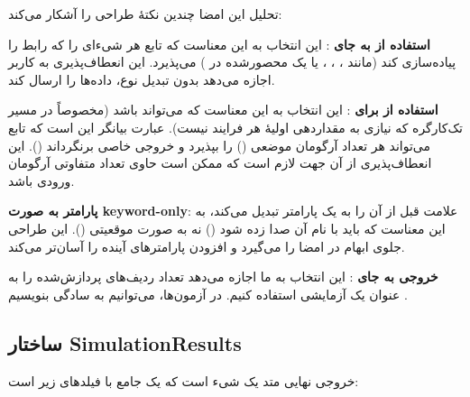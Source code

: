 \noindent تحلیل این امضا چندین نکتۀ طراحی را آشکار می‌کند:

\textbf{استفاده از  به جای }: این انتخاب به این معناست که تابع هر شیءای را که رابط  را پیاده‌سازی کند (مانند ، ، ، یا یک  محصورشده در ) می‌پذیرد. این انعطاف‌پذیری به کاربر اجازه می‌دهد بدون تبدیل نوع، داده‌ها را ارسال کند.

\textbf{استفاده از  برای }: این انتخاب به این معناست که  می‌تواند  باشد (مخصوصاً در مسیر تک‌کارگره که نیازی به مقداردهی اولیهٔ هر فرایند نیست). عبارت  بیانگر این است که تابع می‌تواند هر تعداد آرگومان موضعی () را بپذیرد و خروجی خاصی برنگرداند (). این انعطاف‌‌پذیری از آن جهت لازم است که  ممکن است حاوی تعداد متفاوتی آرگومان ورودی باشد.

\textbf{پارامتر  به صورت keyword-only}: علامت \lr{*} قبل از  آن را به یک پارامتر  تبدیل می‌کند، به این معناست که باید با نام آن صدا زده شود () نه به صورت موقعیتی (). این طراحی جلوی ابهام در امضا را می‌گیرد و افزودن پارامترهای آینده را آسان‌تر می‌کند.

\textbf{خروجی  به جای }: این انتخاب به ما اجازه می‌دهد تعداد ردیف‌های پردازش‌شده را به عنوان یک  آزمایشی استفاده کنیم. در آزمون‌ها، می‌توانیم به سادگی بنویسیم .

\subsection{ساختار SimulationResults}

خروجی نهایی متد  یک شیء  است که یک  جامع با فیلدهای زیر است:

